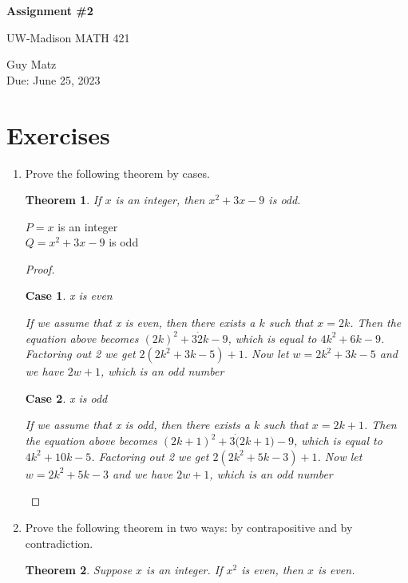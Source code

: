 \documentclass{article} %
\theoremstyle{plain}
\newtheorem*{theorem*}{Theorem}
\theoremstyle{case}
\newtheorem{case}{Case}
\begin{document}
\begin{center}
\Large{\textbf{Assignment \#2}
            
UW-Madison MATH 421} %
\vspace{5pt}
        
\normalsize{  Guy Matz%
        \\ Due: June 25, 2023}
\vspace{15pt}
\end{center}

\section*{Exercises}%
\begin{enumerate}[label={\fbox{\textbf{Exercise \#\arabic* :}}}]
\item Prove the following theorem by cases. 

\begin{theorem*}
  If $x$ is an integer, then $x^2 + 3x-9$ is odd. 
\end{theorem*}

$P = x$ is an integer\\
$Q = x^2 + 3x - 9$ is odd

\begin{proof}
  \begin{case}
    x is even

    If we assume that x is even, then there exists a $k$ such that $x=2k$.
    Then the equation above becomes $(2k)^2 + 3\dot 2k -9$, which is equal
    to $4k^2 + 6k - 9$.  Factoring out 2 we get $2(2k^2 + 3k - 5) + 1$.
    Now let $w = 2k^2 + 3k -5$ and we have $2w + 1$, which is an odd
    number
  \end{case}
  \begin{case}
    x is odd

    If we assume that x is odd, then there exists a $k$ such that $x=2k+1$.
    Then the equation above becomes $(2k+1)^2+3\dot(2k+1)-9$, which is equal
    to $4k^2 + 10k - 5$.  Factoring out 2 we get $2(2k^2 + 5k - 3) + 1$.
    Now let $w = 2k^2 + 5k -3$ and we have $2w + 1$, which is an odd
    number
  \end{case}
\end{proof}

\newpage
\item Prove the following theorem in two ways: by contrapositive and by contradiction. 

\begin{theorem*}
  Suppose $x$ is an integer. If $x^2$ is even, then $x$ is even. 
\end{theorem*}


\end{enumerate}
\end{document}
